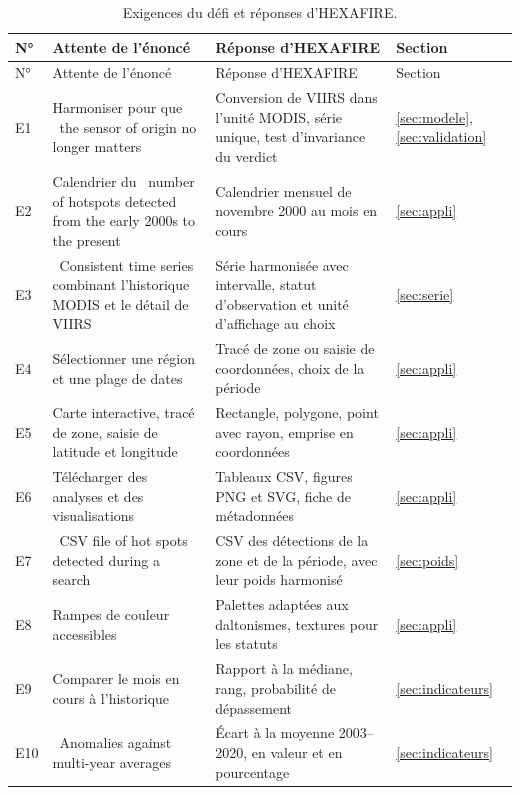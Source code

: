 \documentclass[11pt,a4paper]{article}
\newcommand{\og}{\guillemotleft~}
\newcommand{\fg}{~\guillemotright}
\begin{document}
\begin{longtable}{>{\raggedright\arraybackslash}p{0.8cm} >{\raggedright\arraybackslash}p{5.2cm} >{\raggedright\arraybackslash}p{6.6cm} >{\raggedright\arraybackslash}p{1.4cm}}
\caption{Exigences du défi et réponses d'HEXAFIRE.}\label{tab:exigences}\\
\toprule
N° & Attente de l'énoncé & Réponse d'HEXAFIRE & Section \\
\midrule\endfirsthead
\toprule
N° & Attente de l'énoncé & Réponse d'HEXAFIRE & Section \\
\midrule\endhead
\small E1 & \small Harmoniser pour que \og the sensor of origin no longer matters\fg & \small Conversion de VIIRS dans l'unité MODIS, série unique, test d'invariance du verdict & \small \ref{sec:modele}, \ref{sec:validation} \\
\small E2 & \small Calendrier du \og number of hotspots detected from the early 2000s to the present\fg & \small Calendrier mensuel de novembre 2000 au mois en cours & \small \ref{sec:appli} \\
\small E3 & \small \og Consistent time series\fg{} combinant l'historique MODIS et le détail de VIIRS & \small Série harmonisée avec intervalle, statut d'observation et unité d'affichage au choix & \small \ref{sec:serie} \\
\small E4 & \small Sélectionner une région et une plage de dates & \small Tracé de zone ou saisie de coordonnées, choix de la période & \small \ref{sec:appli} \\
\small E5 & \small Carte interactive, tracé de zone, saisie de latitude et longitude & \small Rectangle, polygone, point avec rayon, emprise en coordonnées & \small \ref{sec:appli} \\
\small E6 & \small Télécharger des analyses et des visualisations & \small Tableaux CSV, figures PNG et SVG, fiche de métadonnées & \small \ref{sec:appli} \\
\small E7 & \small \og CSV file of hot spots detected during a search\fg & \small CSV des détections de la zone et de la période, avec leur poids harmonisé & \small \ref{sec:poids} \\
\small E8 & \small Rampes de couleur accessibles & \small Palettes adaptées aux daltonismes, textures pour les statuts & \small \ref{sec:appli} \\
\small E9 & \small Comparer le mois en cours à l'historique & \small Rapport à la médiane, rang, probabilité de dépassement & \small \ref{sec:indicateurs} \\
\small E10 & \small \og Anomalies against multi-year averages\fg & \small Écart à la moyenne 2003--2020, en valeur et en pourcentage & \small \ref{sec:indicateurs} \\

\end{longtable}
\end{document}
